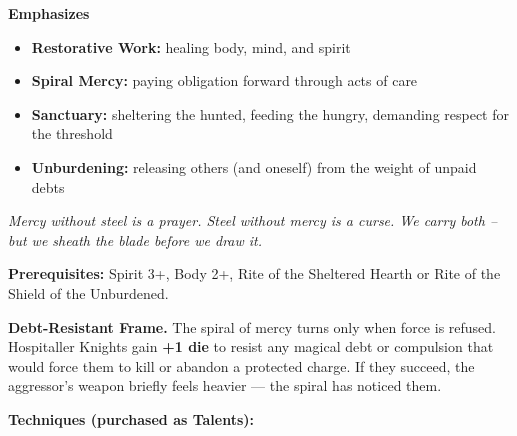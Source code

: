 \noindent\textbf{Emphasizes}
\begin{itemize}
  \item \textbf{Restorative Work:} healing body, mind, and spirit
  \item \textbf{Spiral Mercy:} paying obligation forward through acts of care
  \item \textbf{Sanctuary:} sheltering the hunted, feeding the hungry, demanding respect for the threshold
  \item \textbf{Unburdening:} releasing others (and oneself) from the weight of unpaid debts
\end{itemize}

\begin{tcolorbox}[colback=black!5,colframe=blue!50!black,title=\textbf{Hospitaller Knight of the Gray Spiral (Oath of Mercy and Grace)},breakable]
  \emph{Mercy without steel is a prayer. Steel without mercy is a curse. We carry both -- but we sheath the blade before we draw it.}

  \vspace{2mm}
  \noindent\textbf{Prerequisites:} Spirit 3+, Body 2+, Rite of the Sheltered Hearth or Rite of the Shield of the Unburdened.

  \vspace{2mm}
  \noindent\textbf{Debt-Resistant Frame.} The spiral of mercy turns only when force is refused. Hospitaller Knights gain \textbf{+1 die} to resist any magical debt or compulsion that would force them to kill or abandon a protected charge. If they succeed, the aggressor's weapon briefly feels heavier --- the spiral has noticed them.

  \vspace{2mm}
  \noindent\textbf{Techniques (purchased as Talents):}


\end{tcolorbox}
